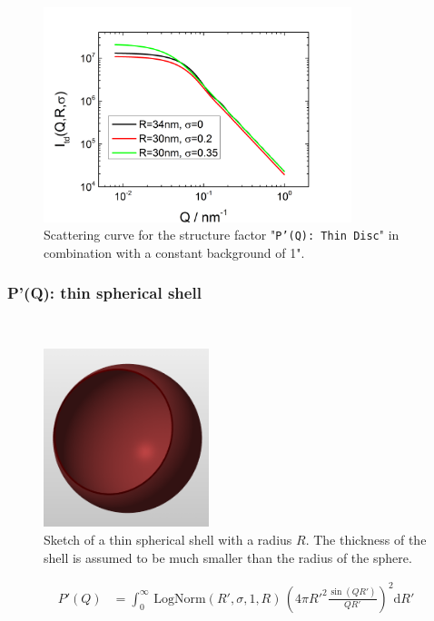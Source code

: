 \begin{figure}[htb]
\begin{center}
\includegraphics[width=0.8\textwidth,height=0.55\textwidth]{../images/form_factor/anisotropic/PprimeThinDisc.png}
\end{center}
\caption{Scattering curve for the structure factor "\texttt{P'(Q): Thin Disc}" in combination with a constant background of 1".}
\label{fig_IQ:PprimeThinDisc}
\end{figure}

\clearpage
\subsubsection{P'(Q): thin spherical shell} ~\\
\label{plugin:Pprime4spShell}

\begin{figure}[htb]
\begin{center}
\includegraphics[width=0.43\textwidth,height=0.463\textwidth]{../images/form_factor/anisotropic/Sphere_thin.png}
\end{center}
\caption{Sketch of a thin spherical shell with a radius $R$. The thickness of the shell is assumed to be much smaller than the radius of the sphere.}
\label{fig:ThinSphericalShell}
\end{figure}
\begin{align}
P'(Q) &= \int_0^\infty \, \mathrm{LogNorm}(R',\sigma,1,R)\, \left(4\pi R'^2\frac{\sin(QR')}{QR'}\right)^2 \mathrm{d}R'
\end{align}

